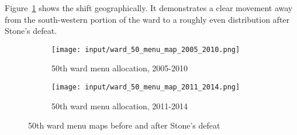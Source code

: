 Figure~\ref{fig:stone_spending_maps} shows the shift geographically. 
It demonstrates a clear movement away from the south-western portion of the ward to a roughly even distribution after Stone's defeat.

\begin{figure}[H]
    \centering
    \begin{subfigure}[b]{0.45\textwidth} %
    \texttt{[image: input/ward\_50\_menu\_map\_2005\_2010.png]}
    \caption{50th ward menu allocation, 2005-2010}
    \end{subfigure}
    \hfill %
    \begin{subfigure}[b]{0.45\textwidth}
    \texttt{[image: input/ward\_50\_menu\_map\_2011\_2014.png]}
    \caption{50th ward menu allocation, 2011-2014}
    \end{subfigure}
    \caption{50th ward menu maps before and after Stone's defeat}
    \label{fig:stone_spending_maps}
\end{figure}

